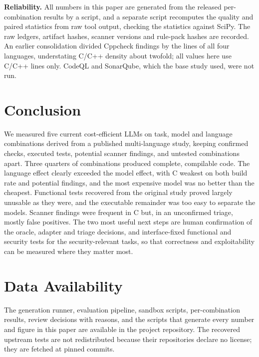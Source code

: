 \documentclass[conference]{IEEEtran}
\begin{document}
\textbf{Reliability.} All numbers in this paper are generated from the released
per-combination results by a script, and a separate script recomputes the quality
and paired statistics from raw tool output, checking the statistics against SciPy.
The raw ledgers, artifact hashes, scanner versions and rule-pack hashes are
recorded. An earlier consolidation divided Cppcheck findings by the lines of
all four languages, understating C/C++ density about twofold; all values here
use C/C++ lines only. CodeQL and SonarQube, which the base
study used, were not run.

\section{Conclusion}

We measured five current cost-efficient LLMs on \nPlanned{} task, model and
language combinations derived from a published multi-language study, keeping
confirmed checks, executed tests, potential scanner findings, and untested
combinations apart. Three quarters of combinations produced complete,
compilable code. The language effect clearly exceeded the model effect, with C
weakest on both build rate and potential findings, and the most expensive model
was no better than the cheapest. Functional tests recovered from the original
study proved largely unusable as they were, and the executable remainder was
too easy to separate the models. Scanner findings were frequent in C but, in an
unconfirmed triage, mostly false positives. The two most useful next steps are
human confirmation of the oracle, adapter and triage decisions, and
interface-fixed functional and security tests for the security-relevant tasks,
so that correctness and exploitability can be measured where they matter most.

\section*{Data Availability}
The generation runner, evaluation pipeline, sandbox scripts, per-combination
results, review decisions with reasons, and the scripts that generate every
number and figure in this paper are available in the project repository. The
recovered upstream tests are not redistributed because their repositories
declare no license; they are fetched at pinned commits.
\end{document}
